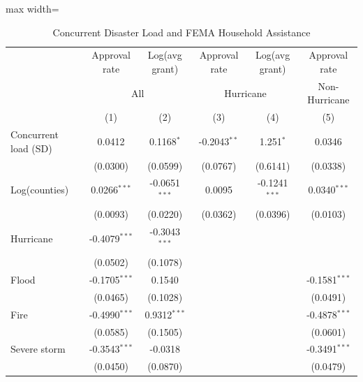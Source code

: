 
\begin{table}[htbp]
   \caption{\label{tab:main} Concurrent Disaster Load and FEMA Household Assistance}
   \bigskip
   \centering
   \begin{adjustbox}{max width=\textwidth}
   \begin{tabular}{lccccc}
      \toprule
                                & Approval rate   & Log(avg grant)  & Approval rate  & Log(avg grant)  & Approval rate\\  
       & \multicolumn{2}{c}{All} & \multicolumn{2}{c}{Hurricane} & Non-Hurricane \\ 
                                & (1)             & (2)             & (3)            & (4)             & (5)\\  
      \midrule 
      Concurrent load (SD)      & 0.0412          & 0.1168$^{*}$    & -0.2043$^{**}$ & 1.251$^{*}$     & 0.0346\\   
                                & (0.0300)        & (0.0599)        & (0.0767)       & (0.6141)        & (0.0338)\\   
      Log(counties)             & 0.0266$^{***}$  & -0.0651$^{***}$ & 0.0095         & -0.1241$^{***}$ & 0.0340$^{***}$\\   
                                & (0.0093)        & (0.0220)        & (0.0362)       & (0.0396)        & (0.0103)\\   
      Hurricane                 & -0.4079$^{***}$ & -0.3043$^{***}$ &                &                 &   \\   
                                & (0.0502)        & (0.1078)        &                &                 &   \\   
      Flood                     & -0.1705$^{***}$ & 0.1540          &                &                 & -0.1581$^{***}$\\   
                                & (0.0465)        & (0.1028)        &                &                 & (0.0491)\\   
      Fire                      & -0.4990$^{***}$ & 0.9312$^{***}$  &                &                 & -0.4878$^{***}$\\   
                                & (0.0585)        & (0.1505)        &                &                 & (0.0601)\\   
      Severe storm              & -0.3543$^{***}$ & -0.0318         &                &                 & -0.3491$^{***}$\\   
                                & (0.0450)        & (0.0870)        &                &                 & (0.0479)\\   

\end{tabular}
\end{adjustbox}
\end{table}

